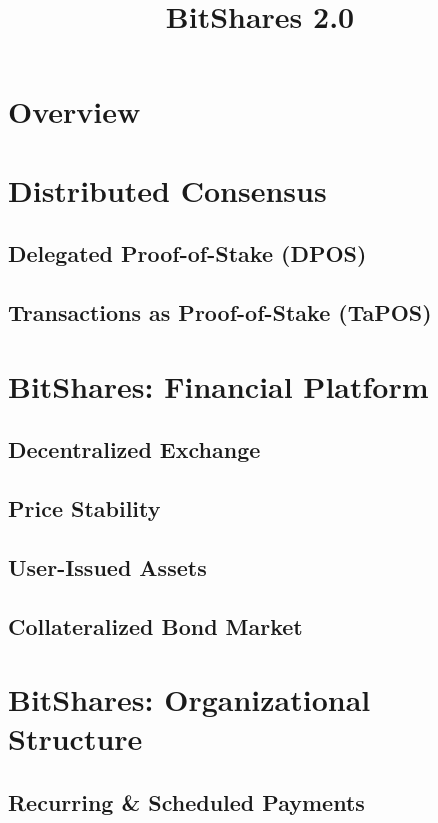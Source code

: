 \documentclass[letterpaper, 10 pt, conference]{ieeeconf}
\title{BitShares 2.0}
\author{}
\begin{document}
\sloppy
\maketitle

\begin{abstract}
\end{abstract}

\section{Overview}
\tableofcontents

\section{Distributed Consensus}
\subsection{Delegated Proof-of-Stake (DPOS)}
\subsection{Transactions as Proof-of-Stake (TaPOS)}

\section{BitShares: Financial Platform}
\subsection{Decentralized Exchange}
\subsection{Price Stability}
\subsection{User-Issued Assets}
\subsection{Collateralized Bond Market}

\section{BitShares: Organizational Structure}
\subsection{Recurring \& Scheduled Payments}
\end{document}
